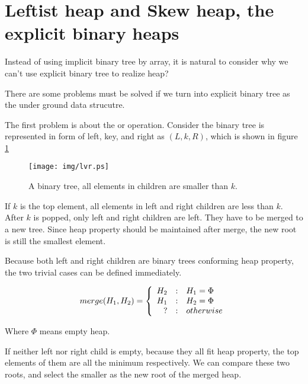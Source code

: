 \documentclass{article}
\begin{document}
\section{Leftist heap and Skew heap, the explicit binary heaps}
\label{ebheap}

Instead of using implicit binary tree by array, it is natural to
consider why we can't use explicit binary tree to realize heap?

There are some problems must be solved if we turn into explicit
binary tree as the under ground data strucutre.

The first problem is about the  or  operation.
Consider the binary tree is represented in form of left, key, and right as
$(L, k, R)$, which is shown in figure \ref{fig:lvr}

\begin{figure}[htbp]
       \begin{center}
       	  \texttt{[image: img/lvr.ps]}
        \caption{A binary tree, all elements in children are smaller than $k$.} \label{fig:lvr}
       \end{center}
\end{figure}

If $k$ is the top element, all elements in left and right children are less
than $k$. After $k$ is popped, only left and right children are left.
They have to be merged to a new tree. Since heap property should be maintained
after merge, the new root is still the smallest element.

Because both left and right children are binary trees conforming heap property,
the two trivial cases can be defined immediately.

\[
merge(H_1, H_2) = \left \{
  \begin{array}
  {r@{\quad:\quad}l}
  H_2 & H_1 = \Phi \\
  H_1 & H_2 = \Phi \\
  ? & otherwise
  \end{array}
\right.
\]

Where $\Phi$ means empty heap.

If neither left nor right child is empty, because they all fit
heap property, the top elements of them are all the minimum respectively.
We can compare these two roots,
and select the smaller as the new root of the merged heap.
\end{document}
